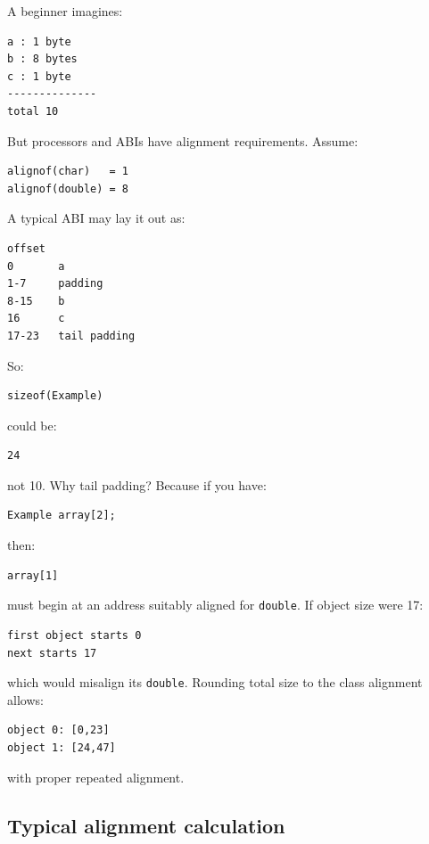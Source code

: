 A beginner imagines:

\begin{verbatim}
a : 1 byte
b : 8 bytes
c : 1 byte
--------------
total 10
\end{verbatim}

But processors and ABIs have alignment requirements. Assume:

\begin{verbatim}
alignof(char)   = 1
alignof(double) = 8
\end{verbatim}

A typical ABI may lay it out as:

\begin{verbatim}
offset
0       a
1-7     padding
8-15    b
16      c
17-23   tail padding
\end{verbatim}

So:

\begin{verbatim}
sizeof(Example)
\end{verbatim}

could be:

\begin{verbatim}
24
\end{verbatim}

not 10. Why tail padding? Because if you have:

\begin{verbatim}
Example array[2];
\end{verbatim}

then:

\begin{verbatim}
array[1]
\end{verbatim}

must begin at an address suitably aligned for \texttt{double}. If object size were 17:

\begin{verbatim}
first object starts 0
next starts 17
\end{verbatim}

which would misalign its \texttt{double}. Rounding total size to the class alignment allows:

\begin{verbatim}
object 0: [0,23]
object 1: [24,47]
\end{verbatim}

with proper repeated alignment.

\subsection{Typical alignment calculation}\label{05-engine-i-ch003-typical-alignment-calculation}

